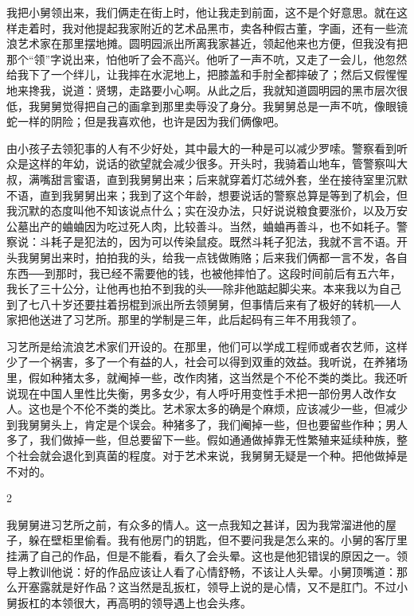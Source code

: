 我把小舅领出来，我们俩走在街上时，他让我走到前面，这不是个好意思。就在这样走着时，我对他提起我家附近的艺术品黑市，卖各种假古董，字画，还有一些流浪艺术家在那里摆地摊。圆明园派出所离我家甚近，领起他来也方便，但我没有把那个“领”字说出来，怕他听了会不高兴。他听了一声不吭，又走了一会儿，他忽然给我下了一个绊儿，让我摔在水泥地上，把膝盖和手肘全都摔破了；然后又假惺惺地来搀我，说道：贤甥，走路要小心啊。从此之后，我就知道圆明园的黑市层次很低，我舅舅觉得把自己的画拿到那里卖辱没了身分。我舅舅总是一声不吭，像眼镜蛇一样的阴险；但是我喜欢他，也许是因为我们俩像吧。 

由小孩子去领犯事的人有不少好处，其中最大的一种是可以减少罗嗦。警察看到听众是这样的年幼，说话的欲望就会减少很多。开头时，我骑着山地车，管警察叫大叔，满嘴甜言蜜语，直到我舅舅出来；后来就穿着灯芯绒外套，坐在接待室里沉默不语，直到我舅舅出来；我到了这个年龄，想要说话的警察总算是等到了机会，但我沉默的态度叫他不知该说点什么；实在没办法，只好说说粮食要涨价，以及万安公墓出产的蛐蛐因为吃过死人肉，比较善斗。当然，蛐蛐再善斗，也不如耗子。警察说：斗耗子是犯法的，因为可以传染鼠疫。既然斗耗子犯法，我就不言不语。开头我舅舅出来时，拍拍我的头，给我一点钱做贿赂；后来我们俩都一言不发，各自东西──到那时，我已经不需要他的钱，也被他摔怕了。这段时间前后有五六年，我长了三十公分，让他再也拍不到我的头──除非他踮起脚尖来。本来我以为自己到了七八十岁还要拄着拐棍到派出所去领舅舅，但事情后来有了极好的转机──人家把他送进了习艺所。那里的学制是三年，此后起码有三年不用我领了。 

习艺所是给流浪艺术家们开设的。在那里，他们可以学成工程师或者农艺师，这样少了一个祸害，多了一个有益的人，社会可以得到双重的效益。我听说，在养猪场里，假如种猪太多，就阉掉一些，改作肉猪，这当然是个不伦不类的类比。我还听说现在中国人里性比失衡，男多女少，有人呼吁用变性手术把一部份男人改作女人。这也是个不伦不类的类比。艺术家太多的确是个麻烦，应该减少一些，但减少到我舅舅头上，肯定是个误会。种猪多了，我们阉掉一些，但也要留些作种；男人多了，我们做掉一些，但总要留下一些。假如通通做掉靠无性繁殖来延续种族，整个社会就会退化到真菌的程度。对于艺术来说，我舅舅无疑是一个种。把他做掉是不对的。

2 

我舅舅进习艺所之前，有众多的情人。这一点我知之甚详，因为我常溜进他的屋子，躲在壁柜里偷看。我有他房门的钥匙，但不要问我是怎么来的。小舅的客厅里挂满了自己的作品，但是不能看，看久了会头晕。这也是他犯错误的原因之一。领导上教训他说：好的作品应该让人看了心情舒畅，不该让人头晕。小舅顶嘴道：那么开塞露就是好作品？这当然是乱扳杠，领导上说的是心情，又不是肛门。不过小舅扳杠的本领很大，再高明的领导遇上也会头疼。 

